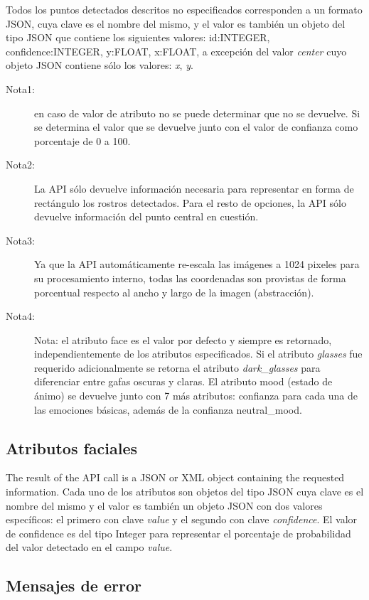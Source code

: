 Todos los puntos detectados descritos no especificados corresponden
a un formato JSON, cuya clave es el nombre del mismo, y el valor es
también un objeto del tipo JSON que contiene los siguientes valores:
id:INTEGER, confidence:INTEGER, y:FLOAT, x:FLOAT, a excepción del
valor \emph{center} cuyo objeto JSON contiene sólo los valores: \emph{x},
\emph{y}.
\begin{description}
\item [{Nota1:}] en caso de valor de atributo no se puede determinar que
no se devuelve. Si se determina el valor que se devuelve junto con
el valor de confianza como porcentaje de 0 a 100. 
\item [{Nota2:}] La API sólo devuelve información necesaria para representar
en forma de rectángulo los rostros detectados. Para el resto de opciones,
la API sólo devuelve información del punto central en cuestión. 
\item [{Nota3:}] Ya que la API automáticamente re-escala las imágenes a
1024 pixeles para su procesamiento interno, todas las coordenadas
son provistas de forma porcentual respecto al ancho y largo de la
imagen (abstracción). 
\item [{Nota4:}] Nota: el atributo face es el valor por defecto y siempre
es retornado, independientemente de los atributos especificados. Si
el atributo \emph{glasses} fue requerido adicionalmente se retorna
el atributo \emph{dark\_glasses} para diferenciar entre gafas oscuras
y claras. El atributo mood (estado de ánimo) se devuelve junto con
7 más atributos: confianza para cada una de las emociones básicas,
además de la confianza neutral\_mood. 
\end{description}

\subsection*{Atributos faciales }

The result of the API call is a JSON or XML object containing the
requested information. Cada uno de los atributos son objetos del tipo
JSON cuya clave es el nombre del mismo y el valor es también un objeto
JSON con dos valores específicos: el primero con clave \emph{value}
y el segundo con clave \emph{confidence}. El valor de confidence es
del tipo Integer para representar el porcentaje de probabilidad del
valor detectado en el campo \emph{value}.


\subsection*{Mensajes de error }

